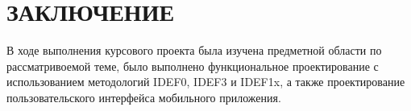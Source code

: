 \section*{ЗАКЛЮЧЕНИЕ}

В ходе выполнения курсового проекта была изучена предметной области
по рассматривоемой теме,
было выполнено функциональное проектирование с использованием методологий
IDEF0, IDEF3 и IDEF1x, а также проектирование пользовательского интерфейса
мобильного приложения.
